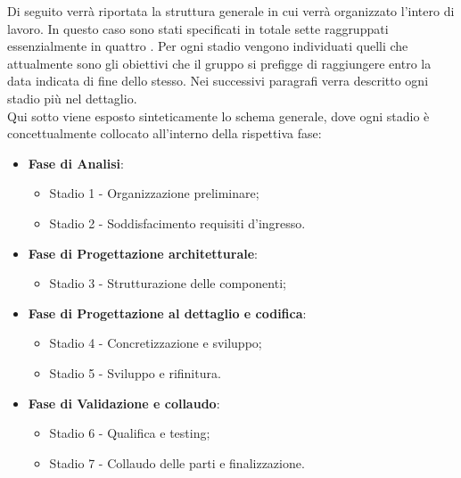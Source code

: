 Di seguito verrà riportata la struttura generale in cui verrà organizzato l'intero  di lavoro. In questo caso sono stati specificati in totale sette  raggruppati essenzialmente in quattro . Per ogni stadio vengono individuati quelli che attualmente sono gli obiettivi che il gruppo \Gruppo{} si prefigge di raggiungere entro la data indicata di fine dello stesso. Nei successivi paragrafi verra descritto ogni stadio più nel dettaglio.\\
Qui sotto viene esposto sinteticamente lo schema generale, dove ogni stadio è concettualmente collocato all'interno della rispettiva fase:

\begin{itemize}
    \item \textbf{Fase di Analisi}:
    \begin{itemize}
        \item Stadio 1 - Organizzazione preliminare;
        \item Stadio 2 - Soddisfacimento requisiti d'ingresso.
    \end{itemize}

    \item \textbf{Fase di Progettazione architetturale}:
    \begin{itemize}
        \item Stadio 3 - Strutturazione delle componenti;
    \end{itemize}

    \item \textbf{Fase di Progettazione al dettaglio e codifica}:
    \begin{itemize}
        \item Stadio 4 - Concretizzazione e sviluppo;
        \item Stadio 5 - Sviluppo e rifinitura.
    \end{itemize}

    \item \textbf{Fase di Validazione e collaudo}:
    \begin{itemize}
        \item Stadio 6 - Qualifica e testing;
        \item Stadio 7 - Collaudo delle parti e finalizzazione.
    \end{itemize}
\end{itemize}

